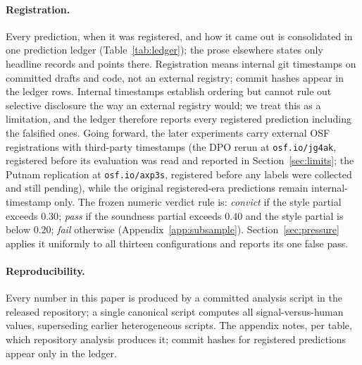\paragraph{Registration.}
Every prediction, when it was registered, and how it came out is consolidated in one prediction ledger (Table~\ref{tab:ledger}); the prose elsewhere states only headline records and points there.
Registration means internal git timestamps on committed drafts and code, not an external registry; commit hashes appear in the ledger rows.
Internal timestamps establish ordering but cannot rule out selective disclosure the way an external registry would; we treat this as a limitation, and the ledger therefore reports every registered prediction including the falsified ones.
Going forward, the later experiments carry external OSF registrations with third-party timestamps (the DPO rerun at \texttt{osf.io/jg4ak}, registered before its evaluation was read and reported in Section~\ref{sec:limits}; the Putnam replication at \texttt{osf.io/axp3s}, registered before any labels were collected and still pending), while the original registered-era predictions remain internal-timestamp only.
The frozen numeric verdict rule is: \emph{convict} if the style partial exceeds $0.30$; \emph{pass} if the soundness partial exceeds $0.40$ and the style partial is below $0.20$; \emph{fail} otherwise (Appendix~\ref{app:subsample}).
Section~\ref{sec:pressure} applies it uniformly to all thirteen configurations and reports its one false pass.

\paragraph{Reproducibility.}
Every number in this paper is produced by a committed analysis script in the released repository; a single canonical script computes all signal-versus-human values, superseding earlier heterogeneous scripts.
The appendix notes, per table, which repository analysis produces it; commit hashes for registered predictions appear only in the ledger.
